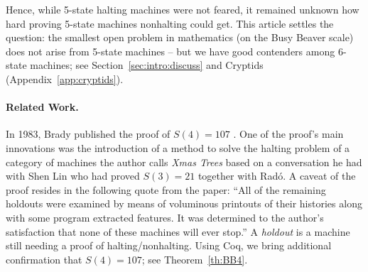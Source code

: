 \documentclass[a4paper,british]{article}
\theoremstyle{definition} %
\numberwithin{equation}{section}
\theoremstyle{definition} %
\newcommand{\ts}[1]{{\color{red}#1}}
\newcommand{\BBtheFourth}{107}
\newcommand{\rado}{Rad\'o\xspace}
\begin{document}
\enlargethispage{\baselineskip}
Hence, while 5-state halting machines were not feared, it remained unknown how hard proving 5-state machines nonhalting could get. This article settles the question: the smallest open problem in mathematics (on the Busy Beaver scale) does not arise from 5-state machines -- but we have good contenders among 6-state machines; see Section~\ref{sec:intro:discuss} and Cryptids (Appendix~\ref{app:cryptids}).

\paragraph{Related Work.} In 1983, Brady published the proof of $S(4) = \BBtheFourth$ \cite{Brady83}. One of the proof's main innovations was the introduction of a method to solve the halting problem of a category of machines the author calls \textit{Xmas Trees} based on a conversation he had with Shen Lin who had proved $S(3) = 21$ together with \rado. A caveat of the proof resides in the following quote from the paper: ``All of the remaining holdouts were examined by means of voluminous printouts of their histories along with some program extracted features. It was determined to the author's satisfaction that none of these machines will ever stop.'' A \textit{holdout} is a machine still needing a proof of halting/nonhalting. Using Coq, we bring additional confirmation that $S(4) = \BBtheFourth$; see Theorem~\ref{th:BB4}.

\newcommand{\SkeletHoldoutsSporadic}{\ts{XX}\xspace}
\end{document}
